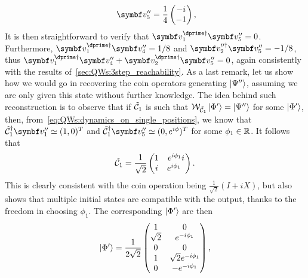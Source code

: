 \begin{example}[label=ex:QWs:conditions_few_steps]
\begin{equation}
\begin{aligned}
        \,\,
        \bs v''_5 = \frac{1}{4}\begin{pmatrix} -i \\ -1 \end{pmatrix},
    \end{aligned}
    \end{equation}
    It is then straightforward to verify that
    $\bs v_1^{\dprime\dagger}\bs v_5'' = 0$.
    Furthermore,
    $\bs v_1^{\dprime\dagger}\bs v_4'' = 1/8$
    and $\bs v_2^{\prime\prime\dagger}\bs v_5'' = -1/8$,
    thus 
    $\bs v_1^{\dprime\dagger}\bs v_4'' + \bs v_2^{\dprime\dagger}\bs v_5'' = 0$,
    again consistently with the results of~\cref{sec:QWs:3step_reachability}.
    As a last remark, let us show how we would go in recovering the coin operators generating $\ket{\Psi''}$, assuming we are only given this state without further knowledge.
    The idea behind such reconstruction is to observe that if $\tilde{{\mathcal{C}}}_1$ is such that ${\mathcal{W}}_{\tilde{{\mathcal{C}}}_1}\ket{\Phi'}=\ket{\Psi''}$ for some $\ket{\Phi'}$, then, from~\cref{eq:QWs:dynamics_on_single_positions}, we know that $\tilde\calC_1^\dagger \bs v_1''\simeq(1,0)^T$ and $\tilde\calC_1^\dagger \bs v_5''\simeq(0,e^{i\phi})^T$ for some $\phi_1\in{\mathbb{R}}$. It follows that
    \begin{equation}
        \tilde{{\mathcal{C}}}_1 =
        \frac{1}{\sqrt2} \begin{pmatrix}
            1 & e^{i\phi_1}i \\
            i & e^{i\phi_1}\phantom{1}
        \end{pmatrix}.
    \end{equation}
    This is clearly consistent with the coin operation being $\frac{1}{\sqrt2}(I+iX)$, but also shows that multiple initial states are compatible with the output, thanks to the freedom in choosing $\phi_1$. The corresponding $\ket{\Phi'}$ are then
    \begin{equation}
        \ket{\Phi'} = \frac{1}{2\sqrt2}
        \begin{pmatrix}
            1 & 0 \\
            \sqrt2 & e^{-i\phi_1} \\
            0 & 0 \\
            1 & \sqrt2 e^{-i\phi_1} \\
            0 & -e^{-i\phi_1}
        \end{pmatrix},

\end{equation}
\end{example}

